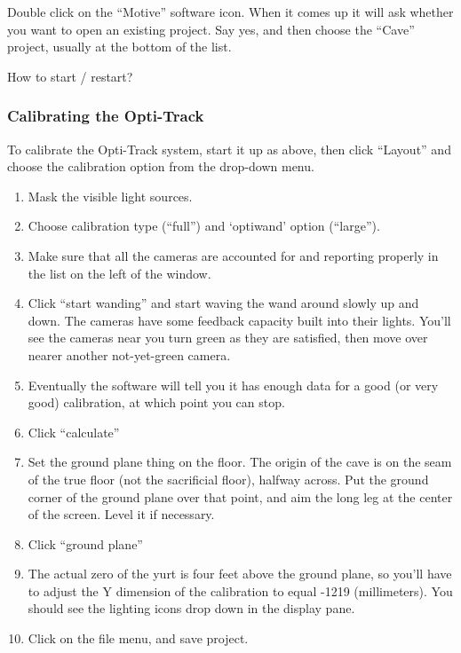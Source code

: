 \documentclass[11pt]{article}
\begin{document}
Double click on the ``Motive'' software icon.  When it comes up it
will ask whether you want to open an existing project.  Say yes, and
then choose the ``Cave'' project, usually at the bottom of the list.


How to start / restart?

\subsubsection{Calibrating the Opti-Track}

To calibrate the Opti-Track system, start it up as above, then click
``Layout'' and choose the calibration option from the drop-down menu.

\begin{enumerate}

\item Mask the visible light sources.

\item Choose calibration type (``full'') and `optiwand' option
  (``large''). 

\item Make sure that all the cameras are accounted for and reporting
  properly in the list on the left of the window.

\item Click ``start wanding'' and start waving the wand around slowly
  up and down.  The cameras have some feedback capacity built into
  their lights.  You'll see the cameras near you turn green as they
  are satisfied, then move over nearer another not-yet-green camera.

\item Eventually the software will tell you it has enough data for a
  good (or very good) calibration, at which point you can stop.

\item Click ``calculate''

\item Set the ground plane thing on the floor.  The origin of the cave is on
  the seam of the true floor (not the sacrificial floor), halfway
  across.  Put the ground corner of the ground plane over that point,
  and aim the long leg at the center of the screen.  Level it if
  necessary.

\item Click ``ground plane''

\item The actual zero of the yurt is four feet above the ground plane,
  so you'll have to adjust the Y dimension of the calibration to equal
  -1219 (millimeters).  You should see the lighting icons drop down in
  the display pane.

\item Click on the file menu, and save project.

\end{enumerate}
\end{document}
